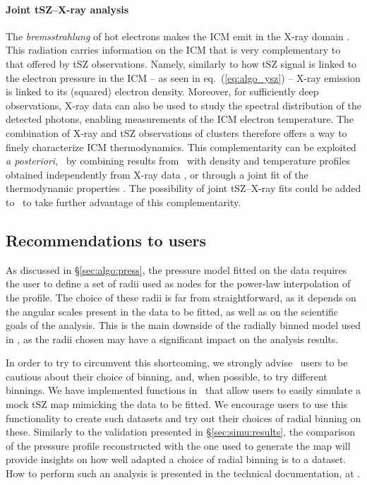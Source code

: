 \paragraph{Joint tSZ--X-ray analysis} %
The \textit{bremsstrahlung} of hot electrons makes the ICM emit in the X-ray domain \citep[see \eg][for reviews]{bohringer_x-ray_2010, bohringer_x-ray_2013}.
This radiation carries information on the ICM that is very complementary to that offered by tSZ observations.
Namely, similarly to how tSZ signal is linked to the electron pressure in the ICM -- as seen in eq.~(\ref{eq:algo_ysz}) -- X-ray emission is linked to its (squared) electron density.
Moreover, for sufficiently deep observations, X-ray data can also be used to study the spectral distribution of the detected photons, enabling measurements of the ICM electron temperature.
The combination of X-ray and tSZ observations of clusters therefore offers a way to finely characterize ICM thermodynamics.
This complementarity can be exploited \textit{a posteriori}, \eg\ by combining results from \panco\ with density and temperature profiles obtained independently from X-ray data \citep[\eg][]{keruzore_exploiting_2020}, or through a joint fit of the thermodynamic properties \citep[\eg][]{castagna_joxsz_2020-1}.
The possibility of joint tSZ--X-ray fits could be added to \panco\ to take further advantage of this complementarity.

\subsection{Recommendations to users}


As discussed in \S\ref{sec:algo:press}, the pressure model fitted on the data requires the user to define a set of radii used as nodes for the power-law interpolation of the profile.
The choice of these radii is far from straightforward, as it depends on the angular scales present in the data to be fitted, as well as on the scientific goals of the analysis.
This is the main downside of the radially binned model used in \panco, as the radii chosen may have a significant impact on the analysis results.

In order to try to circumvent this shortcoming, we strongly advise \panco\ users to be cautious about their choice of binning, and, when possible, to try different binnings.
We have implemented functions in \panco\ that allow users to easily simulate a mock tSZ map mimicking the data to be fitted.
We encourage users to use this functionality to create such datasets and try out their choices of radial binning on these.
Similarly to the validation presented in \S\ref{sec:simu:results}, the comparison of the pressure profile reconstructed with the one used to generate the map will provide insights on how well adapted a choice of radial binning is to a dataset.
How to perform such an analysis is presented in the technical documentation, at .
